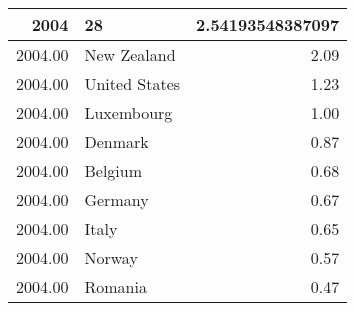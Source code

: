 \begin{table}[ht]
\centering
\begin{tabular}{rlr}
  \hline
2004 & 28 & 2.54193548387097 \\ 
  \hline
2004.00 & New Zealand & 2.09 \\ 
  2004.00 & United States & 1.23 \\ 
  2004.00 & Luxembourg & 1.00 \\ 
  2004.00 & Denmark & 0.87 \\ 
  2004.00 & Belgium & 0.68 \\ 
  2004.00 & Germany & 0.67 \\ 
  2004.00 & Italy & 0.65 \\ 
  2004.00 & Norway & 0.57 \\ 
  2004.00 & Romania & 0.47 \\ 
   \hline
\end{tabular}
\end{table}
